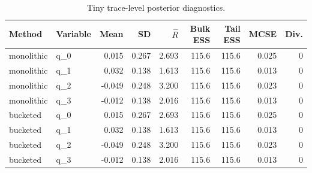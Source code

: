 \begin{table}[t]
\centering
\caption{Tiny trace-level posterior diagnostics.}
\label{tab:diagnostics}
\begin{tabular}{llrrrrrrr}
\hline
Method & Variable & Mean & SD & $\widehat{R}$ & Bulk ESS & Tail ESS & MCSE & Div. \\
\hline
monolithic & q\_0 & 0.015 & 0.267 & 2.693 & 115.6 & 115.6 & 0.025 & 0 \\
monolithic & q\_1 & 0.032 & 0.138 & 1.613 & 115.6 & 115.6 & 0.013 & 0 \\
monolithic & q\_2 & -0.049 & 0.248 & 3.200 & 115.6 & 115.6 & 0.023 & 0 \\
monolithic & q\_3 & -0.012 & 0.138 & 2.016 & 115.6 & 115.6 & 0.013 & 0 \\
bucketed & q\_0 & 0.015 & 0.267 & 2.693 & 115.6 & 115.6 & 0.025 & 0 \\
bucketed & q\_1 & 0.032 & 0.138 & 1.613 & 115.6 & 115.6 & 0.013 & 0 \\
bucketed & q\_2 & -0.049 & 0.248 & 3.200 & 115.6 & 115.6 & 0.023 & 0 \\
bucketed & q\_3 & -0.012 & 0.138 & 2.016 & 115.6 & 115.6 & 0.013 & 0 \\
\hline
\end{tabular}
\end{table}
